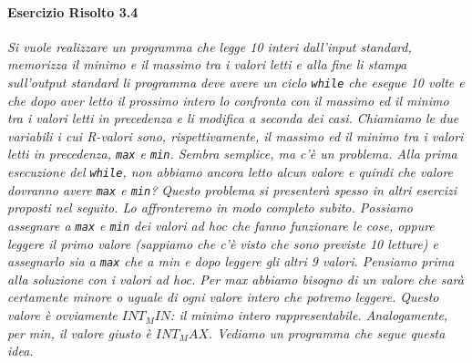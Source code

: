 \documentclass[a4paper,12pt]{book}
\begin{document}
\paragraph{Esercizio Risolto 3.4}
\textit{Si vuole realizzare un programma che legge 10 interi dal­l'input standard, memorizza il minimo e il massimo tra i valori letti e alla fine li stampa sull'output standard li programma deve avere un ciclo \texttt{while} che esegue 10 volte e che dopo aver letto il prossimo intero lo confronta con il massimo ed il minimo tra i valori letti in precedenza e li modifica a seconda dei casi.
Chiamiamo le due variabili i cui R-valori sono, rispettivamente, il massimo ed il minimo tra i valori letti in precedenza, \texttt{max} e \texttt{min}. Sembra semplice, ma c'è un problema.
Alla prima esecuzione del \texttt{while}, non abbiamo ancora letto alcun valore e quindi che valore dovranno avere \texttt{max} e \texttt{min}?
Questo problema si presenterà spesso in altri esercizi proposti nel seguito.
Lo affronteremo in modo completo subito. Possiamo assegnare a \texttt{max} e \texttt{min} dei valori ad hoc che fanno funzionare le cose, oppure leggere il primo valore (sappiamo che c'è visto che sono previste 10 letture) e assegnarlo sia a \texttt{max} che a min e dopo leggere gli altri 9 valori. Pensiamo prima alla soluzione con i valori ad hoc. Per max abbiamo bisogno di un valore che sarà certamente minore o uguale di ogni valore intero che potremo leggere.
Questo valore è ovviamente $INT_MIN$: il minimo intero rappresentabile. Analogamente, per min, il valore giusto è $INT_MAX$. Vediamo un programma che segue questa idea.}
\end{document}
